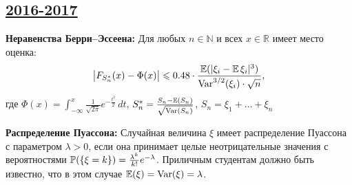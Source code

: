 \newpage
\subsection[2016-2017]{\hyperref[sec:sol_kr_02_2016_2017]{2016-2017}}
\label{sec:kr_02_2016_2017}


\textbf{Неравенства Берри–Эссеена:} Для любых $n \in \mathbb{N}$ и всех $x \in \mathbb{R}$ имеет место оценка:
\[
    \bigl|F_{S_n^{*}}(x) - \Phi(x)\bigr| \leq 0.48 \cdot \frac{\E(|\xi_i - \E\xi_i|^3)}{\Var^{3/2}(\xi_i)\cdot\sqrt{n}} \text{,}
\]
где $\Phi(x) = \int_{-\infty}^{x}\frac{1}{\sqrt{2\pi}}e^{-\frac{t^2}{2}}\,dt$, \; $S_n^* = \frac{S_n - \E(S_n)}{\sqrt{\Var(S_n)}}$, \; $S_n = \xi_1 + \ldots + \xi_n$

\textbf{Распределение Пуассона:} Случайная величина $\xi$ имеет распределение Пуассона с параметром $\lambda > 0$,  если она принимает целые неотрицательные значения с вероятностями $\P(\{\xi = k\}) = \frac{\lambda^k}{k!}e^{-\lambda}$. Приличным студентам должно быть известно, что в этом случае $\E(\xi) = \Var(\xi) = \lambda$.

